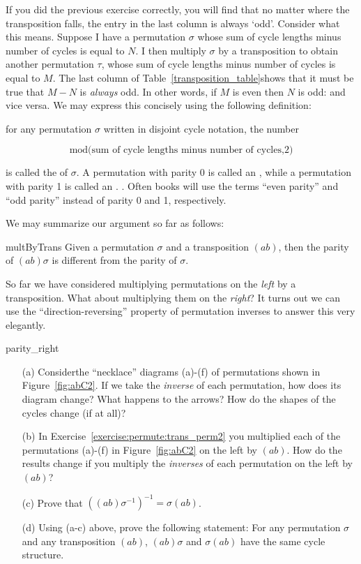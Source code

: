 If you did the previous exercise correctly, you will find that no matter where the transposition falls,  the entry in the last column   is always `odd'. Consider what this means. Suppose I have a permutation  $\sigma$ whose sum of cycle lengths minus number of cycles is equal to $N$. I then multiply $\sigma$ by a transposition to obtain another permutation $\tau$, whose sum of cycle lengths minus number of cycles is equal to $M$. The last column of Table~\ref{transposition_table}shows that it must be true that $M-N$ is \emph{always} odd. In other words, if $M$ is even then $N$ is odd: and vice versa. We may express this concisely using the following definition:


\begin{defn}\label{def_parity} for any permutation $\sigma$ written in disjoint cycle notation, the number 

\[ \text{mod(sum of cycle lengths minus number of cycles,2)} \]

\noindent
is called the  of $\sigma$. A permutation with parity 0 is called an , while a  permutation with parity 1 is called an . .  Often books will use the terms ``even parity'' and ``odd parity''  instead of parity 0 and 1, respectively.
\end{defn}

We may  summarize our argument so far as follows:

\begin{prop}{multByTrans}
Given a permutation $\sigma$ and a transposition $(ab)$, then the parity of $(ab)\sigma$ is different from the parity of $\sigma$.
\end{prop}

So far we have considered multiplying permutations on the \emph{left} by a transposition. What about multiplying them on the \emph{right}? It turns out we can use the ``direction-reversing'' property of permutation inverses to answer this very elegantly.

\begin{exercise}{parity_right}
\begin{enumerate}
\item[(a)]
Considerthe ``necklace'' diagrams  (a)-(f) of permutations shown in Figure~\ref{fig:abC2}. If  we take the \emph{inverse} of each permutation, how does its diagram change? What happens to the arrows? How do the shapes of the cycles change (if at all)? 
\item[(b)] 
In Exercise~\ref{exercise:permute:trans_perm2} you multiplied each of the permutations (a)-(f) in Figure~\ref{fig:abC2} on the left by $(ab)$.  How do the results change if you multiply the \emph{inverses} of each permutation on the left by $(ab)$?
\item[(c)]
Prove that $\left( (ab) \sigma^{-1} \right)^{-1} = \sigma(ab)$.
\item[(d)]
Using (a-c) above, prove the following statement:  For any permutation $\sigma$ and any transposition $(ab)$, $(ab) \sigma$ and $\sigma (ab)$ have the same cycle structure.
\end{enumerate}
\end{exercise}

